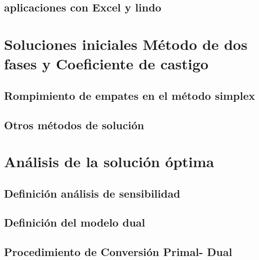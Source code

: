 \documentclass[
  letterpaper,
  DIV=11,
  numbers=noendperiod]{scrreprt}
\theoremstyle{definition}
\theoremstyle{definition}
\theoremstyle{remark}
\begin{document}
\hypertarget{aplicaciones-con-excel-y-lindo}{%
\subsection{aplicaciones con Excel y
lindo}\label{aplicaciones-con-excel-y-lindo}}

\hypertarget{soluciones-iniciales-muxe9todo-de-dos-fases-y-coeficiente-de-castigo}{%
\section{Soluciones iniciales Método de dos fases y Coeficiente de
castigo}\label{soluciones-iniciales-muxe9todo-de-dos-fases-y-coeficiente-de-castigo}}

\hypertarget{rompimiento-de-empates-en-el-muxe9todo-simplex}{%
\subsection{Rompimiento de empates en el método
simplex}\label{rompimiento-de-empates-en-el-muxe9todo-simplex}}

\hypertarget{otros-muxe9todos-de-soluciuxf3n}{%
\subsection{Otros métodos de
solución}\label{otros-muxe9todos-de-soluciuxf3n}}

\hypertarget{anuxe1lisis-de-la-soluciuxf3n-uxf3ptima}{%
\section{Análisis de la solución
óptima}\label{anuxe1lisis-de-la-soluciuxf3n-uxf3ptima}}

\hypertarget{definiciuxf3n-anuxe1lisis-de-sensibilidad}{%
\subsection{Definición análisis de
sensibilidad}\label{definiciuxf3n-anuxe1lisis-de-sensibilidad}}

\hypertarget{definiciuxf3n-del-modelo-dual}{%
\subsection{Definición del modelo
dual}\label{definiciuxf3n-del-modelo-dual}}

\hypertarget{procedimiento-de-conversiuxf3n-primal--dual}{%
\subsection{Procedimiento de Conversión Primal-
Dual}\label{procedimiento-de-conversiuxf3n-primal--dual}}
\end{document}
